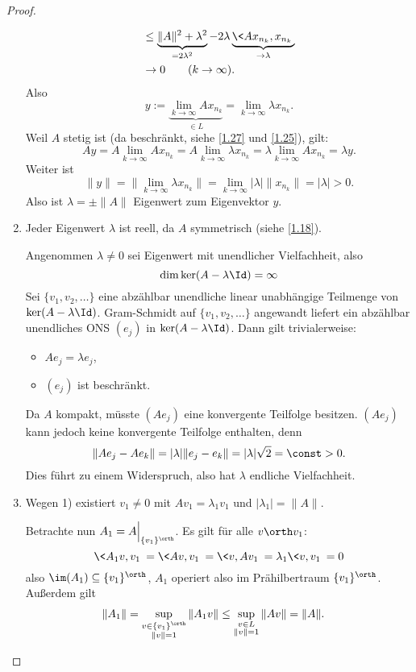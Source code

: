 \begin{st}
\begin{proof}
\begin{enumerate}[1)]
\begin{align*}
					&\le \underbrace{\|A\|^2 + \lambda^2}_{=2\lambda^2} - 2 \lambda \underbrace{\<Ax_{n_k}, x_{n_k}\>}_{\to \lambda} \\
					& \to 0 \qquad (k\to \infty).
				\end{align*}
				Also 
				\[
					y := \underbrace{\lim_{k\to \infty} Ax_{n_k}}_{\in L} = \lim_{k\to \infty} \lambda x_{n_k}.
				\]
				Weil $A$ stetig ist (da beschränkt, siehe \ref{1.27} und \ref{1.25}), gilt:
				\[
					Ay 
					= A \lim_{k\to\infty} A x_{n_k} 
					= A \lim_{k\to\infty} \lambda x_{n_k}
					= \lambda \lim_{k\to\infty} Ax_{n_k}
					= \lambda y.
				\]
				Weiter ist
				\[
					\|y\| 
					= \Big\|\lim_{k\to\infty} \lambda x_{n_k}\Big\|
					= \lim_{k\to\infty} |\lambda| \|x_{n_k}\|
					= |\lambda|
					> 0.
				\]
				Also ist $\lambda = \pm \|A\|$ Eigenwert zum Eigenvektor $y$. 
			\item
{}
				Jeder Eigenwert $\lambda$ ist reell, da $A$ symmetrisch (siehe \ref{1.18}).

				Angenommen $\lambda \neq 0$ sei Eigenwert mit unendlicher Vielfachheit, also
				\[
					\dim \ker (A - \lambda \Id) = \infty
				\]
				Sei $\{v_1,v_2,\dotsc\}$ eine abzählbar unendliche linear unabhängige Teilmenge von $\ker(A-\lambda \Id)$.
				Gram-Schmidt auf $\{v_1,v_2,\dotsc\}$ angewandt liefert ein abzählbar unendliches ONS $(e_j)$ in $\ker (A-\lambda \Id)$.
				Dann gilt trivialerweise:
				\begin{itemize}
					\item
						$Ae_j = \lambda e_j$,
					\item
						$(e_j)$ ist beschränkt.
				\end{itemize}
				Da $A$ kompakt, müsste $(Ae_j)$ eine konvergente Teilfolge besitzen.
				$(Ae_j)$ kann jedoch keine konvergente Teilfolge enthalten, denn
				\[
					\|Ae_j - Ae_k\| = |\lambda| \|e_j-e_k\| = |\lambda| \sqrt 2 = \const > 0.
				\]
				Dies führt zu einem Widerspruch, also hat $\lambda$ endliche Vielfachheit.
			\item
				Wegen 1) existiert $v_1 \neq 0$ mit $Av_1 = \lambda_1v_1$ und $|\lambda_1| = \|A\|$.

				Betrachte nun $A_1 = A \Big|_{\{v_1\}^\orth}$.
				Es gilt für alle $v \orth v_1$:
				\[
					\<A_1v,v_1\> = \<Av,v_1\> = \<v,Av_1\> = \lambda_1\<v,v_1\> = 0
				\]
				also $\im (A_1) \subset \{v_1\}^\orth$, $A_1$ operiert also im Prähilbertraum $\{v_1\}^\orth$.
				Außerdem gilt
				\begin{align*}
					\|A_1\| 
					&= \sup_{\substack{v\in \{v_1\}^\orth \\ \|v\|=1}} \|A_1 v\|
					\le \sup_{\substack{v\in L \\ \|v\|=1}} \|A v\|
					= \|A\|.
				\end{align*}


\end{enumerate}
\end{proof}
\end{st}
